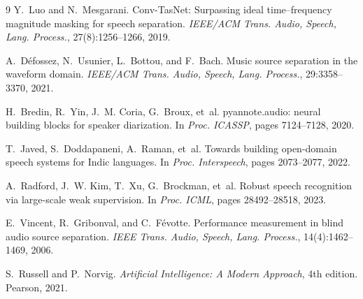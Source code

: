 \documentclass[12pt,a4paper,twocolumn]{article}
\begin{document}
\clearpage
\begin{thebibliography}{9}
\small
{}
Y.~Luo and N.~Mesgarani.
\newblock Conv-TasNet: Surpassing ideal time--frequency magnitude masking for speech separation.
\newblock \emph{IEEE/ACM Trans. Audio, Speech, Lang. Process.}, 27(8):1256--1266, 2019.

A.~D{\'e}fossez, N.~Usunier, L.~Bottou, and F.~Bach.
\newblock Music source separation in the waveform domain.
\newblock \emph{IEEE/ACM Trans. Audio, Speech, Lang. Process.}, 29:3358--3370, 2021.

H.~Bredin, R.~Yin, J.~M. Coria, G.~Broux, et~al.
\newblock pyannote.audio: neural building blocks for speaker diarization.
\newblock In \emph{Proc. ICASSP}, pages 7124--7128, 2020.

T.~Javed, S.~Doddapaneni, A.~Raman, et~al.
\newblock Towards building open-domain speech systems for Indic languages.
\newblock In \emph{Proc. Interspeech}, pages 2073--2077, 2022.

A.~Radford, J.~W. Kim, T.~Xu, G.~Brockman, et~al.
\newblock Robust speech recognition via large-scale weak supervision.
\newblock In \emph{Proc. ICML}, pages 28492--28518, 2023.

E.~Vincent, R.~Gribonval, and C.~F{\'e}votte.
\newblock Performance measurement in blind audio source separation.
\newblock \emph{IEEE Trans. Audio, Speech, Lang. Process.}, 14(4):1462--1469, 2006.

S.~Russell and P.~Norvig.
\newblock \emph{Artificial Intelligence: A Modern Approach}, 4th edition.
\newblock Pearson, 2021.
\end{thebibliography}
\end{document}

